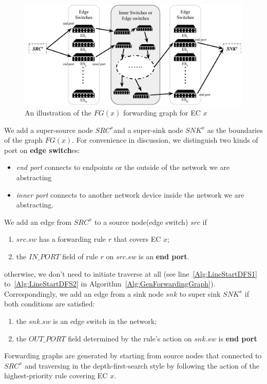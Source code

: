 \begin{figure}[t]
\centering
\includegraphics[scale=.75]{figures/ForwardingGraph.pdf}
\caption{An illustration of the $FG(x)$ forwarding graph for EC $x$}
\label{Fig:ForwardingGraphECX}
\end{figure}

We add a super-source node $SRC^x$and a super-sink node $SNK^x$ as
the boundaries of the graph $FG(x)$.
For convenience in discussion, we distinguish two kinds of port on \textbf{edge switch}es:
\begin{itemize}
\item \textit{end port} connects to endpoints or the outside of the network we are abstracting
\item \textit{inner port} connects to another network device inside the network we are abstracting.
\end{itemize}
We add an edge from $SRC^x$ to a source node(edge switch) $src$ if
\begin{enumerate}
\item $src.sw$ has a forwarding rule $r$ that covers EC $x$;
\item the $IN\_PORT$ field of rule $r$ on $src.sw$ is an \textbf{end port}.
\end{enumerate}
otherwise, we don't need to initiate traverse at all
(see line~\ref{Alg:LineStartDFS1} to~\ref{Alg:LineStartDFS2}
in Algorithm~\ref{Alg:GenForwardingGraph}).
Correspondingly, we add an edge from a sink node $snk$ to super sink $SNK^x$
if both conditions are satisfied:
\begin{enumerate}
\item the $snk.sw$ is an edge switch in the network;
\item the $OUT\_PORT$ field determined by the rule's action on $snk.sw$
        is \textbf{end port}
\end{enumerate}
Forwarding graphs are generated by starting from source nodes that connected to $SRC^x$
and traversing in the depth-first-search style by following the action of
the highest-priority rule covering EC $x$.

